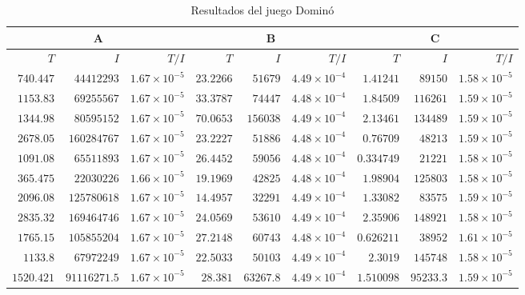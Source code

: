 \begin{table}[ht]
   \scriptsize
    \centering
    \begin{tabular}{r r r | r r r | r r r}
    \multicolumn{3}{c}{A} & \multicolumn{3}{c}{B} & \multicolumn{3}{c}{C} \\ \hline
    $T$ & $I$ & $T/I$ & $T$ & $I$ & $T/I$ & $T$ & $I$ & $T/I$ \\  \hline
    $740.447$ & $44412293$ & $1.67 {\times} 10 ^{-5}$ & $23.2266$ & $51679$ & $4.49 {\times} 10 ^{-4}$ & $1.41241$ & $89150$ & $1.58 {\times} 10 ^{-5}$ \\
    $1153.83$ & $69255567$ & $1.67 {\times} 10 ^{-5}$ & $33.3787$ & $74447$ & $4.48 {\times} 10 ^{-4}$ & $1.84509$ & $116261$ & $1.59 {\times} 10 ^{-5}$ \\
    $1344.98$ & $80595152$ & $1.67 {\times} 10 ^{-5}$ & $70.0653$ & $156038$ & $4.49 {\times} 10 ^{-4}$ & $2.13461$ & $134489$ & $1.59 {\times} 10 ^{-5}$ \\
    $2678.05$ & $160284767$ & $1.67 {\times} 10 ^{-5}$ & $23.2227$ & $51886$ & $4.48 {\times} 10 ^{-4}$ & $0.76709$ & $48213$ & $1.59 {\times} 10 ^{-5}$ \\
    $1091.08$ & $65511893$ & $1.67 {\times} 10 ^{-5}$ & $26.4452$ & $59056$ & $4.48 {\times} 10 ^{-4}$ & $0.334749$ & $21221$ & $1.58 {\times} 10 ^{-5}$ \\
    $365.475$ & $22030226$ & $1.66 {\times} 10 ^{-5}$ & $19.1969$ & $42825$ & $4.48 {\times} 10 ^{-4}$ & $1.98904$ & $125803$ & $1.58 {\times} 10 ^{-5}$ \\
    $2096.08$ & $125780618$ & $1.67 {\times} 10 ^{-5}$ & $14.4957$ & $32291$ & $4.49 {\times} 10 ^{-4}$ & $1.33082$ & $83575$ & $1.59 {\times} 10 ^{-5}$ \\
    $2835.32$ & $169464746$ & $1.67 {\times} 10 ^{-5}$ & $24.0569$ & $53610$ & $4.49 {\times} 10 ^{-4}$ & $2.35906$ & $148921$ & $1.58 {\times} 10 ^{-5}$ \\
    $1765.15$ & $105855204$ & $1.67 {\times} 10 ^{-5}$ & $27.2148$ & $60743$ & $4.48 {\times} 10 ^{-4}$ & $0.626211$ & $38952$ & $1.61 {\times} 10 ^{-5}$ \\
    $1133.8$ & $67972249$ & $1.67 {\times} 10 ^{-5}$ & $22.5033$ & $50103$ & $4.49 {\times} 10 ^{-4}$ & $2.3019$ & $145748$ & $1.58 {\times} 10 ^{-5}$ \\\hline
    $1520.421$ & $91116271.5$ & $1.67 {\times} 10 ^{-5}$ & $28.381$ & $63267.8$ & $4.49 {\times} 10 ^{-4}$ & $1.510098$ & $95233.3$ & $1.59 {\times} 10 ^{-5}$ \\ \hline
    \end{tabular}
    \caption{Resultados del juego Dominó}
    \label{tab:resultados-domino}
\end{table}

